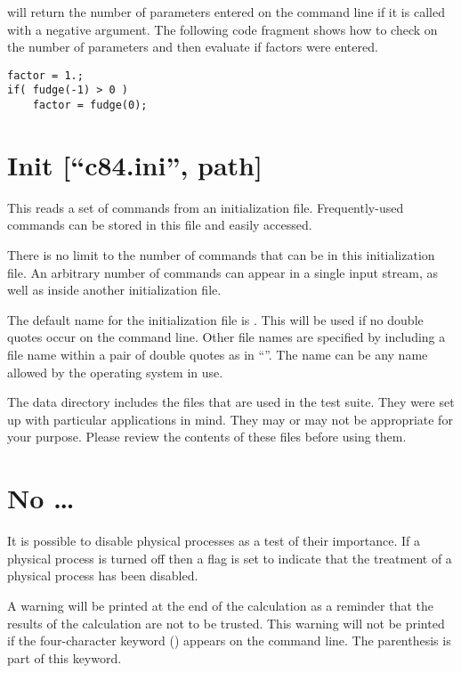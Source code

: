  will return the number of parameters entered
on the command line
if it is called with a negative argument.
The following code fragment shows
how to check on the number of parameters and then evaluate
 if  factors were entered.
\begin{verbatim}
factor = 1.;
if( fudge(-1) > 0 )
    factor = fudge(0);
\end{verbatim}

\section{Init [``c84.ini'', path]}

This reads a set of commands from an initialization file.
Frequently-used
commands can be stored in this file and easily accessed.

There is no limit to the number of commands that can be in this
initialization file.
An arbitrary number of  commands can appear in a single
input stream, as well as inside another initialization file.

The default name for the initialization file is .  This will
be used if no double quotes occur on the command line.
Other file names
are specified by including a file name within a pair of double quotes as
in ``''.
The name can be any name allowed by the operating system in use.

The data directory includes the  files that are used
in the test suite.
They were set up with particular applications in mind.
They may or may
not be appropriate for your purpose.
Please review the contents of these
files before using them.

\section{No \dots}

It is possible to disable physical processes as a test of their
importance.
If a physical process is turned off then a flag is set to
indicate that the treatment of a physical process has been disabled.

A warning will be printed at the end of the calculation as a reminder
that the results of the calculation are not to be trusted.
This warning
will not be printed if the four-character keyword () appears on the command
line.
The parenthesis is part of this keyword.

